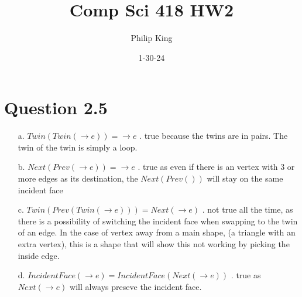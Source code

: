 \documentclass[12pt]{article}
\title{Comp Sci 418 HW2}
\author{Philip King}
\date{1-30-24}
\begin{document}
\maketitle
\section*{Question 2.5}
\begin{itemize}
    \item[a.] $Twin(Twin(\rightarrow{e})) = \rightarrow{e}$
    \newline. \hspace{.5cm} true because the twins are in pairs. The twin of the twin is simply a loop.
    \item[b.] $Next(Prev(\rightarrow{e})) = \rightarrow{e}$
    \newline. \hspace*{.5cm} true as even if there is an vertex with 3 or more edges as its destination, the $Next(Prev())$ will stay on the same incident face 
    \item[c.] $Twin(Prev(Twin(\rightarrow{e}))) = Next(\rightarrow{e})$
    \newline. \hspace*{.5cm} not true all the time, as there is a possibility of switching the incident face when swapping to the twin of an edge. In the case of vertex away from a main shape, (a triangle with an extra vertex), this is a shape that will show this not working by picking the inside edge.
    \item[d.] $IncidentFace(\rightarrow{e}) = IncidentFace(Next(\rightarrow{e}))$
    \newline. \hspace*{.5cm} true as $Next(\rightarrow{e})$ will always preseve the incident face.
\end{itemize}
\pagebreak
\end{document}
